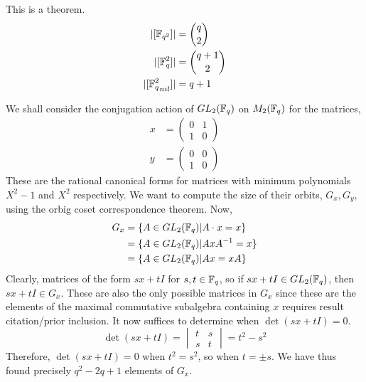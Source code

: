 \documentclass{amsart}
\begin{document}
\begin{theorem}
    This is a theorem.
    \begin{align}
        |[\protect\mathbb{F}_{q^2}]|       &= \binom{q}{2} \\
        |[\protect\mathbb{F}_q^2]|         &= \binom{q + 1}{2} \\
        |[{\protect\mathbb{F}_q^2}_{nil}]| &= q + 1
    \end{align}
\end{theorem}
\begin{theorem}
    We shall consider the conjugation action of $GL_2(\protect\mathbb{F}_q)$ on $M_2(\protect\mathbb{F}_q)$ for the matrices,
    \begin{align*}
        x &= 
        \begin{pmatrix}
            0 & 1 \\
            1 & 0
        \end{pmatrix} \\
        y &=
        \begin{pmatrix}
            0 & 0 \\
            1 & 0
        \end{pmatrix}
    \end{align*}
    These are the rational canonical forms for matrices with minimum polynomials $X^2 - 1$ and $X^2$ respectively.
    We want to compute the size of their orbits, $G_x, G_y$, using the orbig coset correspondence theorem.
    Now,
    \begin{align*}
        G_x &= \{A \in GL_2(\protect\mathbb{F}_q) | A \cdot x = x\} \\
            &= \{A \in GL_2(\protect\mathbb{F}_q) | AxA^{-1} = x\} \\
            &= \{A \in GL_2(\protect\mathbb{F}_q) | Ax = xA\} 
    \end{align*}
    Clearly, matrices of the form $sx + tI$ for $s,t \in \protect\mathbb{F}_q$, so if $sx + tI \in GL_2(\protect\mathbb{F}_q)$, then $sx + tI \in G_x$. These are also the only possible matrices in $G_x$ since these are the elements of the maximal commutative subalgebra containing $x$ {\color{blue} requires result citation/prior inclusion}. It now suffices to determine when $\det(sx + tI) = 0$.
    \begin{equation*}
        \det(sx+tI) =
        \begin{vmatrix}
            t & s \\
            s & t
        \end{vmatrix} = t^2 - s^2
    \end{equation*}
    Therefore, $\det(sx + tI) = 0$ when $t^2 = s^2$, so when $t = \pm s$. We have thus found precisely $q^2 - 2q + 1$ elements of $G_x$.

\end{theorem}
\end{document}
